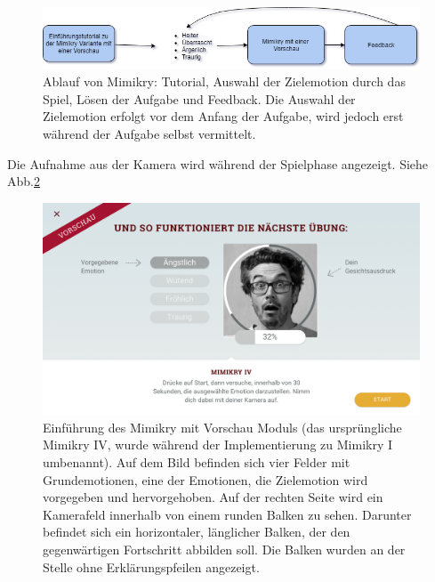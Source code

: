 \begin{figure}[!ht]
\centering\includegraphics[width=360pt]{texes/implementierung_mimikry_preview.png}
\caption{Ablauf von Mimikry: Tutorial, Auswahl der Zielemotion durch das Spiel, Lösen der Aufgabe und Feedback. Die Auswahl der Zielemotion erfolgt vor dem Anfang der Aufgabe, wird jedoch erst während der Aufgabe selbst vermittelt.}
\label{mit_diagramm}
\end{figure}
Die Aufnahme aus der Kamera wird während der Spielphase angezeigt. Siehe Abb.\ref{mit}
\begin{figure}[!ht]
\centering\includegraphics[width=330pt]{res/TASK_MIMIKRY_IV_INTRO.png}
\caption{Einführung des Mimikry mit Vorschau Moduls (das ursprüngliche Mimikry IV, wurde während der Implementierung zu Mimikry I umbenannt). Auf dem Bild befinden sich vier Felder mit Grundemotionen, eine der Emotionen, die Zielemotion wird vorgegeben und hervorgehoben. Auf der rechten Seite wird ein Kamerafeld innerhalb von einem runden Balken zu sehen. Darunter befindet sich ein horizontaler, länglicher Balken, der den gegenwärtigen Fortschritt abbilden soll. Die Balken wurden an der Stelle ohne Erklärungspfeilen angezeigt.}
\label{mit}
\end{figure}
\newpage
